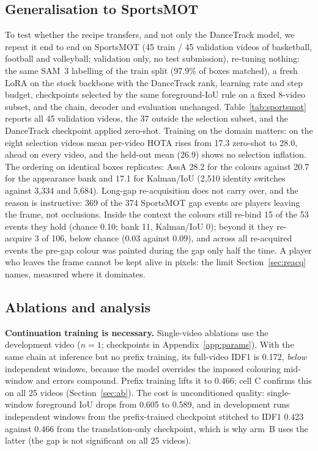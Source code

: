 \documentclass{article} %
\newcommand{\rev}[1]{{\color{blue}#1}}
\begin{document}
\subsection{Generalisation to SportsMOT}
\label{sec:sportsmot}
To test whether the recipe transfers, and not only the DanceTrack model, we repeat it end to
end on SportsMOT \citep{cui2023sportsmot} (45 train / 45 validation videos of basketball,
football and volleyball; validation only, no test submission), re-tuning nothing: the same
SAM~3 labelling of the train split (97.9\% of boxes matched), a fresh LoRA on the stock
backbone with the DanceTrack rank, learning rate and step budget, checkpoints selected by the
same foreground-IoU rule on a fixed 8-video subset, and the chain, decoder and evaluation
unchanged. Table~\ref{tab:sportsmot} reports all 45 validation videos, the 37 outside the
selection subset, and the DanceTrack checkpoint applied zero-shot. Training on the domain
matters: on the eight selection videos mean per-video HOTA rises from 17.3 zero-shot to
28.0, ahead on every video, and the held-out mean (26.9) shows no selection inflation. The
ordering on identical boxes replicates: AssA 28.2 for the colours against 20.7 for the
appearance bank and 17.1 for Kalman/IoU (2,510 identity switches against 3,334 and 5,684).
Long-gap re-acquisition does not carry over, and the reason is instructive: 369 of the 374
SportsMOT gap events are players leaving the frame, not occlusions. Inside the context the
colours still re-bind 15 of the 53 events they hold (chance 0.10; bank 11, Kalman/IoU 0);
beyond it they re-acquire 3 of 106, below chance (0.03 against 0.09), and across all re-acquired events the
pre-gap colour was painted during the gap only half the time. A player who leaves the frame
cannot be kept alive in pixels: the limit Section~\ref{sec:reacq} names, measured where it
dominates.

\subsection{Ablations and analysis}
\label{sec:ablations}

\textbf{Continuation training is necessary.} Single-video ablations use the development
video ($n{=}1$; checkpoints in Appendix~\ref{app:params}). With the same chain at inference
but no prefix training, its full-video IDF1 is 0.172, \emph{below} independent windows,
because the model overrides the imposed colouring mid-window and errors compound. Prefix
training lifts it to 0.466\rev{; cell C confirms this on all 25 videos (Section~\ref{sec:ab})}.
The cost is unconditioned quality:
single-window foreground IoU drops from 0.605 to 0.589, and \rev{in development runs}
independent windows from the prefix-trained checkpoint stitched to IDF1 0.423 against 0.466
from the translation-only checkpoint, which is why arm~B uses the latter
\rev{(the gap is not significant on all 25 videos)}.
\end{document}
